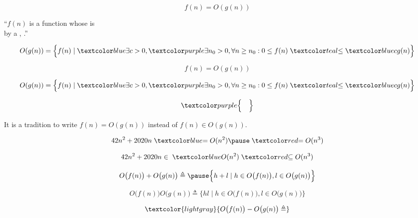 \begin{frame}{}
  \begin{center}
    \[
      \boxed{f(n) = O(g(n))}
    \]

    \pause
    ``$f(n)$ is a function whose  is  \\
    by a , .''
    \pause
    \vspace{0.30cm}

    \pause
    \vspace{-0.50cm}
    \[
        O(g(n)) = \Big\{f(n) \mid \blue{\exists c > 0}, 
        \purple{\exists n_0 > 0, \forall n \ge n_0}: 
        0 \le f(n) \;\teal{\le}\; \blue{c g(n)} \Big\}
    \]
  \end{center}
\end{frame}

\begin{frame}{}
  \[
   \boxed{f(n) = O(g(n))}
  \]

  \[
      O(g(n)) = \Big\{f(n) \mid \blue{\exists c > 0}, 
      \purple{\exists n_0 > 0, \forall n \ge n_0}: 
      0 \le f(n) \;\teal{\le}\; \blue{c g(n)} \Big\}
  \]

  \pause
  \[
	\purple{\Big\{ \quad \Big\}}
  \]

  \pause
  \vspace{0.50cm}
  \begin{center}
    It is a tradition to write $f(n) = O(g(n))$ instead of $f(n) \in O(g(n))$.
  \end{center}
\end{frame}

\begin{frame}{}
  \[
    42n^2 + 2020n \;\blue{= O(n^2)} \pause \;\red{= O(n^3)}
  \]

  \pause
  \[
    42n^2 + 2020n \in \;\blue{O(n^2)} \;\red{\subseteq O(n^3)}
  \]
\end{frame}

\begin{frame}{}
  \[
    O\big(f(n)\big) + O\big(g(n)\big) \triangleq \pause
    \Big\{ h + l \mid h \in O\big(f(n)\big), l \in O\big(g(n)\big) \Big\}
  \]

  \pause
  \[
    O\big(f(n)\big) O\big(g(n)\big) \triangleq 
    \Big\{ h l \mid h \in O\big(f(n)\big), l \in O\big(g(n)\big) \Big\}
  \]

  \pause
  \[
    \textcolor{lightgray}{O\big(f(n)\big) - O\big(g(n)\big) \triangleq}
  \]
\end{frame}


